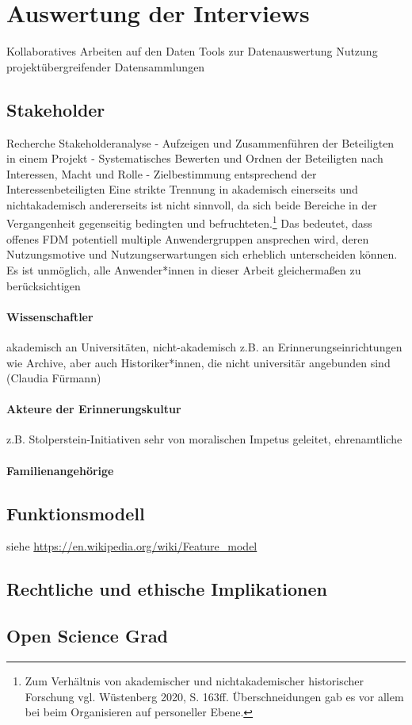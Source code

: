 \section{Auswertung der Interviews}
Kollaboratives Arbeiten auf den Daten
Tools zur Datenauswertung
Nutzung projektübergreifender Datensammlungen 

\subsection{Stakeholder}
Recherche
Stakeholderanalyse
- Aufzeigen und Zusammenführen der Beteiligten in einem Projekt
- Systematisches Bewerten und Ordnen der Beteiligten nach Interessen, Macht und Rolle
- Zielbestimmung entsprechend der Interessenbeteiligten
Eine strikte Trennung in akademisch einerseits und nichtakademisch andererseits ist nicht sinnvoll, da sich beide Bereiche in der Vergangenheit gegenseitig bedingten und befruchteten.\footnote{Zum Verhältnis von akademischer und nichtakademischer historischer Forschung vgl. Wüstenberg 2020, S. 163ff. Überschneidungen gab es vor allem bei beim Organisieren auf personeller Ebene.} Das bedeutet, dass offenes FDM potentiell multiple Anwendergruppen ansprechen wird, deren Nutzungsmotive und Nutzungserwartungen sich erheblich unterscheiden können. Es ist unmöglich, alle Anwender*innen in dieser Arbeit gleichermaßen zu berücksichtigen
\paragraph{Wissenschaftler}

akademisch an Universitäten, nicht-akademisch z.B. an Erinnerungseinrichtungen wie Archive, aber auch Historiker*innen, die nicht universitär angebunden sind (Claudia Fürmann)


\paragraph{Akteure der Erinnerungskultur}

z.B. Stolperstein-Initiativen sehr von moralischen Impetus geleitet, ehrenamtliche

\paragraph{Familienangehörige}

\subsection{Funktionsmodell}

siehe \url{https://en.wikipedia.org/wiki/Feature_model}


\subsection{Rechtliche und ethische Implikationen}


\subsection{Open Science Grad}
